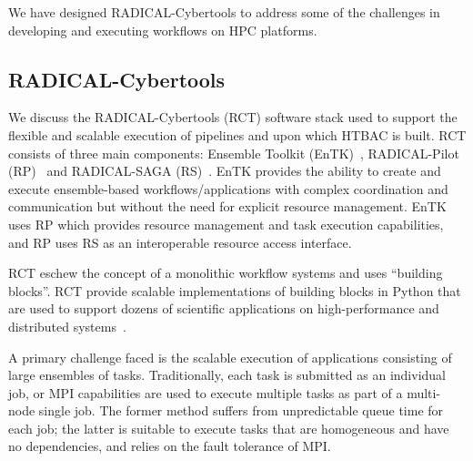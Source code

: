 
We have designed RADICAL-Cybertools to address some of the challenges in
developing and executing workflows on HPC platforms. 

\subsection{RADICAL-Cybertools}

We discuss the RADICAL-Cybertools (RCT) software stack used to support the
flexible and scalable execution of pipelines and upon which HTBAC is built.
RCT consists of three main components: Ensemble Toolkit
(EnTK)~\cite{balasubramanian2016ensemble}, RADICAL-Pilot
(RP)~\cite{merzky2015radical} and RADICAL-SAGA (RS)~\cite{saga-x}. EnTK
provides the ability to create and execute ensemble-based
workflows/applications with complex coordination and communication but
without the need for explicit resource management. EnTK uses RP which
provides resource management and task execution capabilities, and RP uses RS
as an interoperable resource access  interface. %

RCT eschew the concept of a monolithic workflow systems and uses ``building
blocks''. RCT provide scalable implementations of building blocks in Python
that are used to support dozens of scientific applications on high-performance
and distributed systems~\cite{turilli2016analysis, angius2017converging,
treikalis2016repex, balasubramanian2016ensemble, balasubramanian2016extasy}. 



A primary challenge faced is the scalable execution of applications
consisting of large ensembles of tasks.  Traditionally, each task is
submitted as an individual job, or MPI capabilities are used to  execute
multiple tasks as part of a multi-node single job. The former method suffers
from unpredictable queue time for each job; the latter is suitable to execute
tasks that are homogeneous and have no dependencies, and relies on the fault
tolerance of MPI\@.

